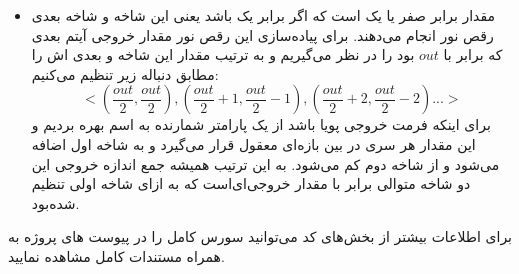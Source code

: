 \begin{itemize}
	\item
	مقدار 
	برابر صفر یا یک است که اگر برابر یک باشد یعنی این شاخه و شاخه بعدی رقص نور انجام می‌دهند. برای پیاده‌سازی این رقص نور مقدار خروجی آیتم بعدی که برابر با
	$out$
	بود را در نظر می‌گیریم و به ترتیب مقدار این شاخه و بعدی اش را مطابق دنباله زیر تنظیم می‌کنیم:
	$$<(\frac{out}{2}, \frac{out}{2}), (\frac{out}{2} + 1, \frac{out}{2} - 1), (\frac{out}{2} + 2, \frac{out}{2} - 2) ... >$$
	برای اینکه فرمت خروجی پویا باشد از یک پارامتر شمارنده به اسم
	بهره بردیم و این مقدار هر سری در بین بازه‌ای معقول قرار می‌گیرد و به شاخه اول اضافه می‌شود و از شاخه دوم کم می‌شود. به این ترتیب همیشه جمع اندازه خروجی این دو شاخه متوالی برابر با مقدار خروجی‌ای‌است که به ازای شاخه اولی تنظیم شده‌بود.
		\begin{latin}
		
	\end{latin}
\end{itemize}

برای اطلاعات بیشتر از بخش‌های کد می‌توانید سورس کامل را در پیوست های پروژه به همراه مستندات کامل مشاهده نمایید.

